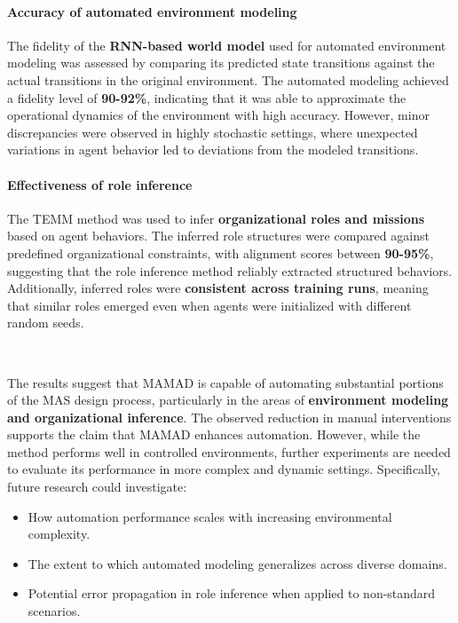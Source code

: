 \documentclass[pdflatex,sn-mathphys-num]{sn-jnl}%
\theoremstyle{thmstyleone}%
\theoremstyle{thmstyletwo}%
\theoremstyle{thmstylethree}%
\begin{document}
\paragraph{Accuracy of automated environment modeling} 
The fidelity of the \textbf{RNN-based world model} used for automated environment modeling was assessed by comparing its predicted state transitions against the actual transitions in the original environment. The automated modeling achieved a fidelity level of \textbf{90-92\%}, indicating that it was able to approximate the operational dynamics of the environment with high accuracy. However, minor discrepancies were observed in highly stochastic settings, where unexpected variations in agent behavior led to deviations from the modeled transitions.

\paragraph{Effectiveness of role inference}
The TEMM method was used to infer \textbf{organizational roles and missions} based on agent behaviors. The inferred role structures were compared against predefined organizational constraints, with alignment scores between \textbf{90-95\%}, suggesting that the role inference method reliably extracted structured behaviors. Additionally, inferred roles were \textbf{consistent across training runs}, meaning that similar roles emerged even when agents were initialized with different random seeds.

\

The results suggest that MAMAD is capable of automating substantial portions of the MAS design process, particularly in the areas of \textbf{environment modeling and organizational inference}. The observed reduction in manual interventions supports the claim that MAMAD enhances automation. However, while the method performs well in controlled environments, further experiments are needed to evaluate its performance in more complex and dynamic settings. Specifically, future research could investigate:
\begin{itemize}
    \item How automation performance scales with increasing environmental complexity.
    \item The extent to which automated modeling generalizes across diverse domains.
    \item Potential error propagation in role inference when applied to non-standard scenarios.
\end{itemize}
\end{document}
